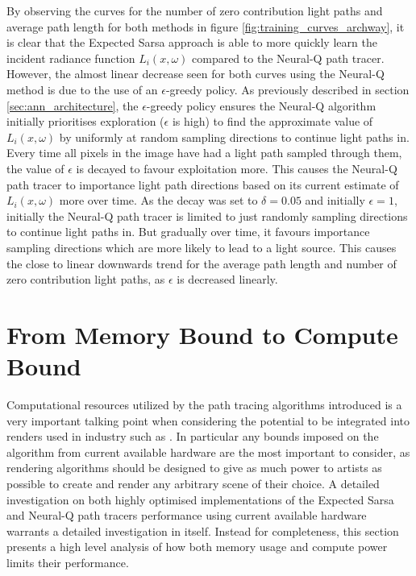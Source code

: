 \documentclass[../dissertation.tex]{subfiles}
\begin{document}
By observing the curves for the number of zero contribution light paths and average path length for both methods in figure \ref{fig:training_curves_archway}, it is clear that the Expected Sarsa approach is able to more quickly learn the incident radiance function $L_i(x, \omega)$ compared to the Neural-Q path tracer. However, the almost linear decrease seen for both curves using the Neural-Q method is due to the use of an $\epsilon$-greedy policy. As previously described in section \ref{sec:ann_architecture}, the $\epsilon$-greedy policy ensures the Neural-Q algorithm initially prioritises exploration ($\epsilon$ is high) to find the approximate value of $L_i(x,\omega)$ by uniformly at random sampling directions to continue light paths in. Every time all pixels in the image have had a light path sampled through them, the value of $\epsilon$ is decayed to favour exploitation more. This causes the Neural-Q path tracer to importance light path directions based on its current estimate of $L_i(x, \omega)$ more over time. As the decay was set to $\delta = 0.05$ and initially $\epsilon = 1$, initially the Neural-Q path tracer is limited to just randomly sampling directions to continue light paths in. But gradually over time, it favours importance sampling directions which are more likely to lead to a light source. This causes the close to linear downwards trend for the average path length and number of zero contribution light paths, as $\epsilon$ is decreased linearly. 

\section{From Memory Bound to Compute Bound}
\label{sec:mem_to_comp}

Computational resources utilized by the path tracing algorithms introduced is a very important talking point when considering the potential to be integrated into renders used in industry such as \cite{georgiev2018arnold, christensen2018renderman, hyperion}. In particular any bounds imposed on the algorithm from current available hardware are the most important to consider, as rendering algorithms should be designed to give as much power to artists as possible to create and render any arbitrary scene of their choice. A detailed investigation on both highly optimised implementations of the Expected Sarsa and Neural-Q path tracers performance using current available hardware warrants a detailed investigation in itself. Instead for completeness, this section presents a high level analysis of how both memory usage and compute power limits their performance.
\end{document}
